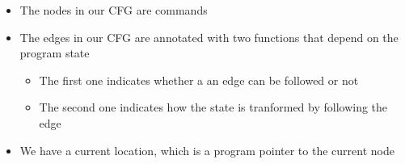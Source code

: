 \begin{frame}[fragile]
\begin{itemize}
\item<2->{The nodes in our CFG are commands}
\item<3->{The edges in our CFG are annotated with two functions that depend on the program state}
  \begin{itemize}
  \item<4->{The first one indicates whether a an edge can be followed or not}
  \item<5->{The second one indicates how the state is tranformed by following the edge}
  \end{itemize}
 \item<6->{We have a current location, which is a program pointer to the current node}
\end{itemize}


\end{frame}


